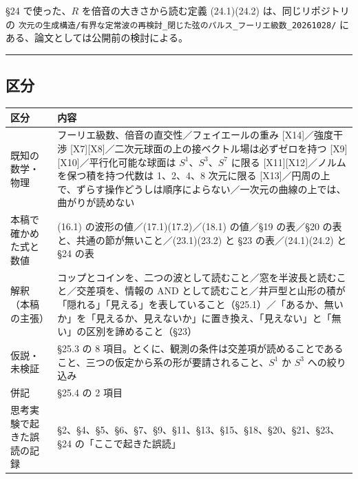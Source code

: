 \documentclass[
  a4paper,
]{ltjsarticle}
\newcounter{none} %
\begin{document}
§24 で使った、\(R\) を倍音の大きさから読む定義 (24.1)(24.2)
は、同じリポジトリの
\texttt{次元の生成構造/\allowbreak{}有界な定常波の再検討\_\allowbreak{}閉じた弦のパルス\_\allowbreak{}フーリエ級数\_\allowbreak{}20261028/\allowbreak{}}
にある、論文としては公開前の検討による。

\begin{center}\rule{0.5\linewidth}{0.5pt}\end{center}

\subsection{区分}\label{ux533aux5206}

{\def\LTcaptype{none} %
\begin{longtable}[]{@{}
  >{\raggedright\arraybackslash}p{}
  >{\raggedright\arraybackslash}p{}@{}}
\toprule\noalign{}
\begin{minipage}[b]{\linewidth}\raggedright
区分
\end{minipage} & \begin{minipage}[b]{\linewidth}\raggedright
内容
\end{minipage} \\
\midrule\noalign{}
\endhead
\bottomrule\noalign{}
\endlastfoot
既知の数学・物理 & フーリエ級数、倍音の直交性／フェイエールの重み
{[}X14{]}／強度干渉
{[}X7{]}{[}X8{]}／二次元球面の上の接ベクトル場は必ずゼロを持つ
{[}X9{]}{[}X10{]}／平行化可能な球面は \(S^1\)、\(S^3\)、\(S^7\) に限る
{[}X11{]}{[}X12{]}／ノルムを保つ積を持つ代数は 1、2、4、8 次元に限る
{[}X13{]}／円周の上で、ずらす操作どうしは順序によらない／一次元の曲線の上では、曲がりが読めない \\
本稿で確かめた式と数値 & (16.1) の波形の値／(17.1)(17.2)／(18.1)
の値／§19 の表／§20 の表と、共通の節が無いこと／(23.1)(23.2) と §23
の表／(24.1)(24.2) と §24 の表 \\
解釈（本稿の主張） &
コップとコインを、二つの波として読むこと／窓を半波長と読むこと／交差項を、情報の
AND
として読むこと／井戸型と山形の積が「隠れる」「見える」を表していること（§25.1）／「あるか、無いか」を「見えるか、見えないか」に置き換え、「見えない」と「無い」の区別を諦めること（§23） \\
仮説・未検証 & §25.3 の 8
項目。とくに、観測の条件は交差項が読めることであること、三つの仮定から系の形が要請されること、\(S^1\)
か \(S^3\) への絞り込み \\
併記 & §25.4 の 2 項目 \\
思考実験で起きた誤読の記録 &
§2、§4、§5、§6、§7、§9、§11、§13、§15、§18、§20、§21、§23、§24
の「ここで起きた誤読」 \\
\end{longtable}
}
\end{document}
